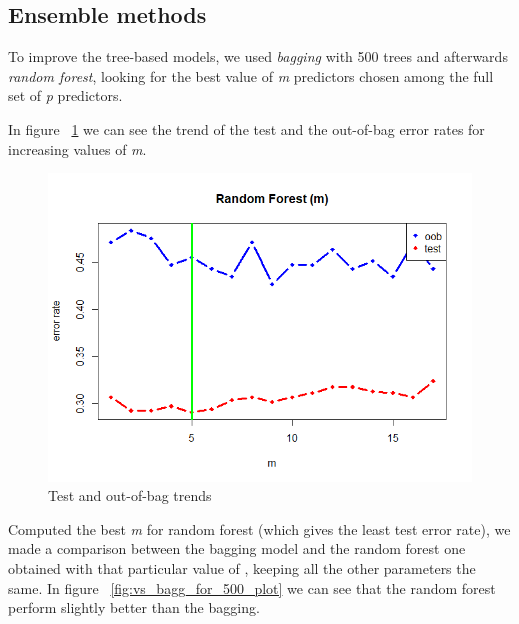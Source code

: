 \subsection{Ensemble methods}

To improve the tree-based models, we used \textit{bagging} with 500 trees and afterwards \textit{random forest}, looking for the best value of \textit{m} predictors chosen among the full set of \textit{p} predictors. 

In figure \Fig~\ref{fig:m_best_for_500_plot} we can see the trend of the test and the out-of-bag error rates for increasing values of \textit{m}.

\begin{figure}[h]
	\centering
	\includegraphics[width=0.5\linewidth]{ImageFiles/Classification/m_best_for_500_plot}
	\caption{Test and out-of-bag trends}
	\label{fig:m_best_for_500_plot}
\end{figure}

Computed the best \textit{m} for random forest (which gives the least test error rate), we made a comparison between the bagging model and the random forest one obtained with that particular value of , keeping all the other parameters the same.
In figure \Fig~\ref{fig:vs_bagg_for_500_plot} we can see that the random forest perform slightly better than the bagging.

